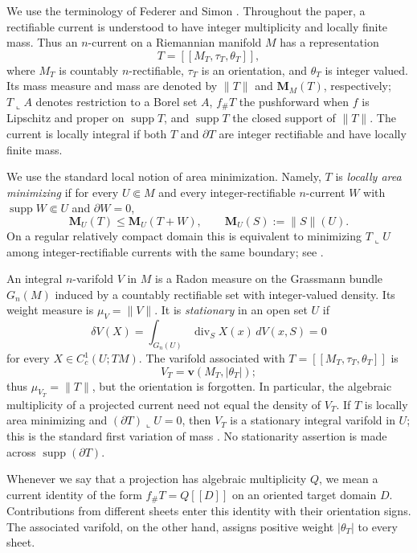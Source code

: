 \documentclass[11pt,reqno]{amsart}
\numberwithin{equation}{section}
\theoremstyle{definition}
\theoremstyle{remark}
\newcommand{\Mass}{\mathbf M}
\newcommand{\supp}{\operatorname{supp}}
\newcommand{\restr}{\mathbin{\llcorner}}
\newcommand{\cur}[1]{\left[\!\left[#1\right]\!\right]}
\begin{document}
We use the terminology of Federer \cite{Federer} and Simon \cite{Simon}.
Throughout the paper, a rectifiable current is understood to have integer
multiplicity and locally finite mass.  Thus an $n$-current on a Riemannian
manifold $M$ has a representation
\[
 T=\cur{M_T,\tau_T,\theta_T},
\]
where $M_T$ is countably $n$-rectifiable, $\tau_T$ is an orientation, and
$\theta_T$ is integer valued.  Its mass measure and mass are denoted by
$\|T\|$ and $\Mass_M(T)$, respectively; $T\restr A$ denotes restriction to
a Borel set $A$, $f_\#T$ the pushforward when $f$ is Lipschitz and proper on
$\supp T$,
and $\supp T$ the closed support of $\|T\|$.  The current is locally integral
if both $T$ and $\partial T$ are integer rectifiable and have locally finite
mass.

We use the standard local notion of area minimization.  Namely, $T$ is
\emph{locally area minimizing} if
for every $U\Subset M$ and every integer-rectifiable $n$-current $W$ with
$\supp W\Subset U$ and $\partial W=0$,
\begin{equation}\label{eq:local-minimizer-definition}
 \Mass_U(T)\le \Mass_U(T+W),
 \qquad \Mass_U(S):=\|S\|(U).
\end{equation}
On a regular relatively compact domain this is equivalent to minimizing
$T\restr U$ among integer-rectifiable currents with the same boundary; see
\cite{Federer,Simon}.  

An integral $n$-varifold $V$ in $M$ is a Radon measure on the Grassmann
bundle $G_n(M)$ induced by a countably rectifiable set with
integer-valued density.  Its weight measure is $\mu_V=\|V\|$.  It is
\emph{stationary} in an open set $U$ if
\begin{equation}\label{eq:stationarity-definition}
 \delta V(X)=\int_{G_n(U)}\operatorname{div}_S X(x)\,dV(x,S)=0
\end{equation}
for every $X\in C_c^1(U;TM)$.  The varifold associated with
$T=\cur{M_T,\tau_T,\theta_T}$ is
\[
 V_T=\mathbf v(M_T,|\theta_T|);
\]
thus $\mu_{V_T}=\|T\|$, but the orientation is forgotten.  In particular,
the algebraic multiplicity of a projected current need not equal the density
of $V_T$.  If $T$ is locally area minimizing and
$(\partial T)\restr U=0$, then $V_T$ is a stationary integral varifold in
$U$; this is the standard first variation of mass
\cite[Sections~16--17]{Simon}.  No stationarity assertion is made across
$\supp(\partial T)$.

Whenever we say that a projection has algebraic multiplicity $Q$, we mean a
current identity of the form $f_\#T=Q\cur{D}$ on an oriented target domain
$D$.  Contributions from different sheets enter this identity with their
orientation signs.  The associated varifold, on the other hand, assigns
positive weight $|\theta_T|$ to every sheet.
\end{document}
